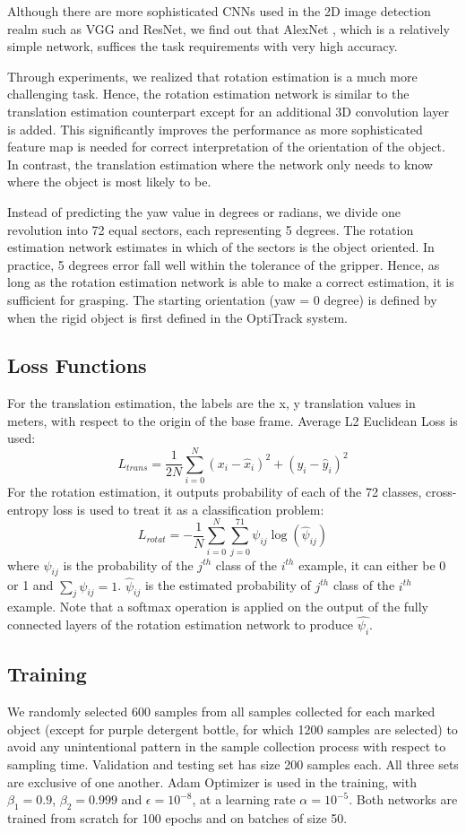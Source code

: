 \documentclass[conference]{IEEEtran}
\begin{document}
Although there are more sophisticated CNNs used in the 2D image detection realm such as VGG and ResNet, we find out that AlexNet \cite{krizhevsky_2012_nips}, which is a relatively simple network, suffices the task requirements with very high accuracy. 

Through experiments, we realized that rotation estimation is a much more challenging task. Hence, the rotation estimation network is similar to the translation estimation counterpart except for an additional 3D convolution layer is added. This significantly improves the performance as more sophisticated feature map is needed for correct interpretation of the orientation of the object. In contrast, the translation estimation where the network only needs to know where the object is most likely to be. 

Instead of predicting the yaw value in degrees or radians, we divide one revolution into 72 equal sectors, each representing 5 degrees. The rotation estimation network estimates in which of the sectors is the object oriented. In practice, 5 degrees error fall well within the tolerance of the gripper. Hence, as long as the rotation estimation network is able to make a correct estimation, it is sufficient for grasping. The starting orientation (yaw = 0 degree) is defined by when the rigid object is first defined in the OptiTrack system. 

\subsection{Loss Functions}
For the translation estimation, the labels are the x, y translation values in meters, with respect to the origin of the base frame. Average L2 Euclidean Loss is used:
$$L_{trans} = \frac{1}{2N}\sum_{i=0}^{N}
(x_{i} - \hat{x}_{i})^{2} + (y_{i} - \hat{y}_{i})^{2}$$
For the rotation estimation, it outputs probability of each of the 72 classes, cross-entropy loss is used to treat it as a classification problem:
$$L_{rotat} = - \frac{1}{N}\sum_{i=0}^{N}\sum_{j=0}^{71}\psi_{ij}\log(\hat{\psi}_{ij})$$
where $\psi_{ij}$ is the probability of the $j^{th}$ class of the $i^{th}$ example, it can either be 0 or 1 and $\sum_{j}\psi_{ij} = 1$. $\hat{\psi}_{ij}$ is the estimated probability of $j^{th}$ class of the $i^{th}$ example. Note that a softmax operation is applied on the output of the fully connected layers of the rotation estimation network to produce $\hat{\psi_{i}}$.

\subsection{Training}
We randomly selected 600 samples from all samples collected for each marked object (except for purple detergent bottle, for which 1200 samples are selected) to avoid any unintentional pattern in the sample collection process with respect to sampling time. Validation and testing set has size 200 samples each. All three sets are exclusive of one another.
Adam Optimizer is used in the training, with $\beta_{1} = 0.9$, $\beta_{2} = 0.999$ and $\epsilon = 10^{-8}$, at a learning rate $\alpha = 10^{-5}$. Both networks are trained from scratch for 100 epochs and on batches of size 50.
\end{document}
